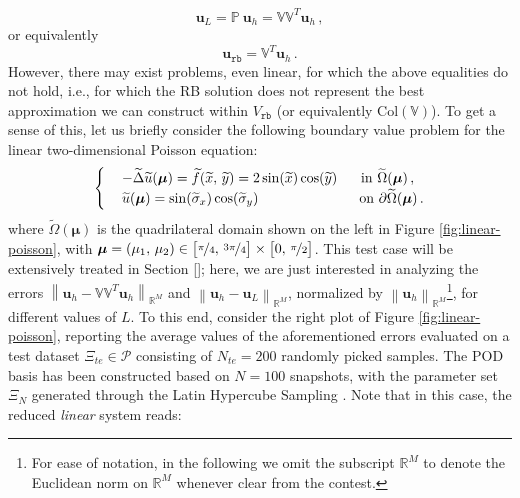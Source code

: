 \documentclass[12pt, a4paper, twoside, openright]{report}
\numberwithin{equation}{chapter}
\theoremstyle{theorem}
\theoremstyle{definition}
\theoremstyle{remark}
\theoremstyle{proposition}
\numberwithin{figure}{chapter}
\newcommand{\norm}[1]{\left\lVert#1\right\rVert}
\newcommand{\wt}[1]{\widetilde{#1}}
\newcommand{\bg}[1]{\boldsymbol{#1}}
\begin{document}
		\begin{equation*}
			\mathbf{u}_L = \mathbb{P} ~ \mathbf{u}_h = \mathbb{V} \mathbb{V}^T \mathbf{u}_h \, ,
		\end{equation*}
		or equivalently
		\begin{equation*}
			\mathbf{u}_{\texttt{rb}} = \mathbb{V}^T \mathbf{u}_h \, .
		\end{equation*}
		However, there may exist problems, even linear, for which the above equalities do not hold, i.e., for which the RB solution does not represent the best approximation we can construct within $V_{\texttt{rb}}$ (or equivalently $\text{Col}(\mathbb{V})$). To get a sense of this, let us briefly consider the following boundary value problem for the linear two-dimensional Poisson equation:
		\begin{equation}
			\label{eq:linear-poisson}
			\begin{cases}
				& - \wt{\Delta} \wt{u}(\bg{\mu}) = \wt{f}(\wt{x}, \, \wt{y}) = 2 \sin(\wt{x}) \cos(\wt{y}) \hspace*{0.6cm} \text{in $\wt{\Omega}(\boldsymbol{\mu})$} \, , \\
				& \wt{u}(\bg{\mu}) = \sin(\wt{\sigma}_x) \cos(\wt{\sigma}_y) \hspace*{2.55cm} \text{on $\partial \wt{\Omega}(\boldsymbol{\mu})$} \, .
			\end{cases}
		\end{equation}
		where $\wt{\Omega}(\boldsymbol{\mu})$ is the quadrilateral domain shown on the left in Figure \ref{fig:linear-poisson}, with $\bg{\mu} = (\mu_1, \, \mu_2) \in \big[ \nicefrac{\pi}{4}, \, \nicefrac{3 \pi}{4} \big] \times \big[ 0, \, \nicefrac{\pi}{2} \big]$. This test case will be extensively treated in Section \ref{}; here, we are just interested in analyzing the errors $\norm{\mathbf{u}_h - \mathbb{V} \mathbb{V}^T \mathbf{u}_h}_{\mathbb{R}^M}$ and $\norm{\mathbf{u}_h - \mathbf{u}_L}_{\mathbb{R}^M}$, normalized by $\norm{\mathbf{u}_h}_{\mathbb{R}^M}$\footnote{For ease of notation, in the following we omit the subscript $\mathbb{R}^M$ to denote the Euclidean norm on $\mathbb{R}^M$ whenever clear from the contest.}, for different values of $L$. To this end, consider the right plot of Figure \ref{fig:linear-poisson}, reporting the average values of the aforementioned errors evaluated on a test dataset $\Xi_{te} \in \mathcal{P}$ consisting of $N_{te} = 200$ randomly picked samples. The POD basis has been constructed based on $N = 100$ snapshots, with the parameter set $\Xi_N$ generated through the Latin Hypercube Sampling \cite{Imam08}. Note that in this case, the reduced \emph{linear} system reads:
\end{document}
